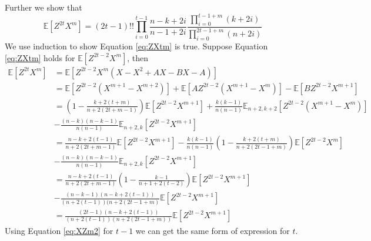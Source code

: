 \documentclass{article}
\def\E{\mathbb{E}}
\begin{document}
Further we show that
\begin{equation}\label{eq:ZXtm}
\E[Z^{2t} X^m] = (2t-1)!! \prod_{i=0}^{t-1}\frac{n-k+2i}{n-1+2i} \frac{\prod_{i=0}^{t-1+m} (k+2i)}{\prod_{i=0}^{2t-1+m}(n+2i)}
\end{equation}
We use induction to show Equation \eqref{eq:ZXtm} is true.
Suppose Equation \eqref{eq:ZXtm} holds for $\E[Z^{2t-2}X^m]$, then
\begin{align*}
\E[Z^{2t}X^m] &= \E[Z^{2t-2}X^m(X-X^2+AX-BX-A)] \\
&= \E[Z^{2t-2}(X^{m+1} - X^{m+2})] + \E[A Z^{2t-2} (X^{m+1} - X^m)] - \E[BZ^{2t-2} X^{m+1}] \\
&= \left(1-\frac{k+2(t+m)}{n+2(2t+m-1)}\right)\E[Z^{2t-2}X^{m+1}] + \frac{k(k-1)}{n(n-1)}\E_{n+2,k+2}[Z^{2t-2}(X^{m+1} - X^m)] \\
&-\frac{(n-k)(n-k-1)}{n(n-1)}\E_{n+2,k}[Z^{2t-2}X^{m+1}]\\
&=\frac{n-k+2(t-1)}{n+2(2t+m-1)}\E[Z^{2t-2}X^{m+1}] - \frac{k(k-1)}{n(n-1)}\left(1-\frac{k+2(t+m)}{n+2(2t-1+m)}\right)
\E[Z^{2t-2}X^m] \\
&-\frac{(n-k)(n-k-1)}{n(n-1)}\E_{n+2,k}[Z^{2t-2}X^{m+1}]\\
&=\frac{n-k+2(t-1)}{n+2(2t+m-1)}\left(1-\frac{k-1}{n+1+2(t-2)}\right)\E[Z^{2t-2}X^{m+1}] \\
&-\frac{(n-k-1)(n-k+2(t-1))}{(n+2(t-1))(n+2(2t-1+m)}\E[Z^{2t-2}X^{m+1}] \\
&=\frac{(2t-1)(n-k+2(t-1))}{(n+2(t-1)) (n+2(2t-1+m))}\E[Z^{2t-2}X^{m+1}] 
\end{align*}
Using Equation \eqref{eq:XZm2} for $t-1$ we can get the same form of expression for $t$.



\end{document}
